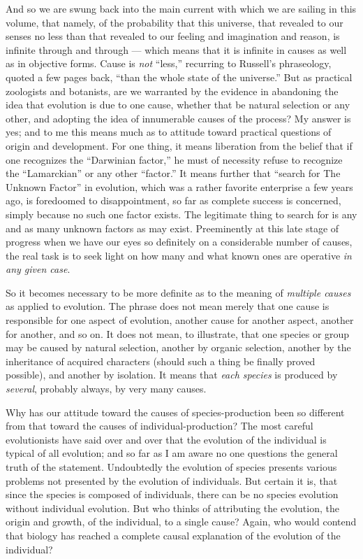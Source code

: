 \documentclass[a4paper, 11pt, oneside, polutonikogreek, english, landscape]{article}
\begin{document}
And so we are swung back into the main current with which we are sailing in this volume, that namely, of the probability that this universe, that revealed to our senses no less than that revealed to our feeling and imagination and reason, is infinite through and through --- which means that it is infinite in causes as well as in objective forms. Cause is \emph{not} ``less,'' recurring to Russell's phraseology, quoted a few pages back, ``than the whole state of the universe.'' But as practical zoologists and botanists, are we warranted by the evidence in abandoning the idea that evolution is due to one cause, whether that be natural selection or any other, and adopting the idea of innumerable causes of the process? My answer is yes; and to me this means much as to attitude toward practical questions of origin and development. For one thing, it means liberation from the belief that if one recognizes the ``Darwinian factor,'' he must of necessity refuse to recognize the ``Lamarckian'' or any other ``factor.'' It means further that ``search for The Unknown Factor'' in evolution, which was a rather favorite enterprise a few years ago, is foredoomed to disappointment, so far as complete success is concerned, simply because no such one factor exists. The legitimate thing to search for is any and as many unknown factors as may exist. Preeminently at this late stage of progress when we have our eyes so definitely on a considerable number of causes, the real task is to seek light on how many and what known ones are operative \emph{in any given case}.

So it becomes necessary to be more definite as to the meaning of \emph{multiple causes} as applied to evolution. The phrase does not mean merely that one cause is responsible for one aspect of evolution, another cause for another aspect, another for another, and so on. It does not mean, to illustrate, that one species or group may be caused by natural selection, another by organic selection, another by the inheritance of acquired characters (should such a thing be finally proved possible), and another by isolation. It means that \emph{each species} is produced by \emph{several}, probably always, by very many causes.

Why has our attitude toward the causes of species-production been so different from that toward the causes of individual-production? The most careful evolutionists have said over and over that the evolution of the individual is typical of all evolution; and so far as I am aware no one questions the general truth of the statement. Undoubtedly the evolution of species presents various problems not presented by the evolution of individuals. But certain it is, that since the species is composed of individuals, there can be no species evolution without individual evolution. But who thinks of attributing the evolution, the origin and growth, of the individual, to a single cause? Again, who would contend that biology has reached a complete causal explanation of the evolution of the individual?
\end{document}
